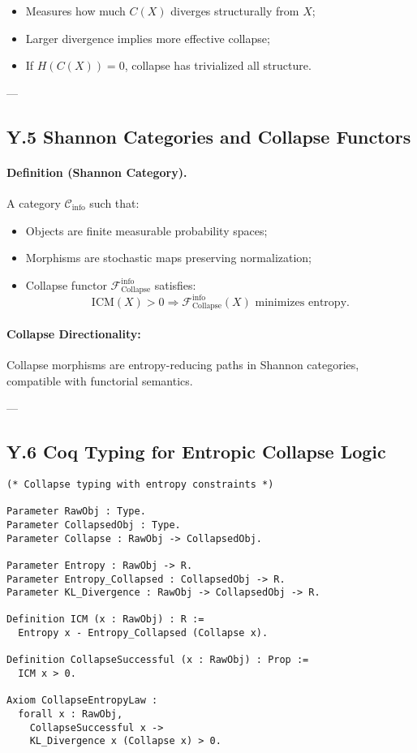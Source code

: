 \documentclass[11pt]{article}
\begin{document}
\begin{itemize}
    \item Measures how much \( C(X) \) diverges structurally from \( X \);
    \item Larger divergence implies more effective collapse;
    \item If \( H(C(X)) = 0 \), collapse has trivialized all structure.
\end{itemize}

---

\subsection*{Y.5 Shannon Categories and Collapse Functors}

\paragraph{Definition (Shannon Category).}
A category \( \mathcal{C}_{\mathrm{info}} \) such that:
\begin{itemize}
    \item Objects are finite measurable probability spaces;
    \item Morphisms are stochastic maps preserving normalization;
    \item Collapse functor \( \mathcal{F}_{\mathrm{Collapse}}^{\mathrm{info}} \) satisfies:
    \[
    \mathrm{ICM}(X) > 0 \Rightarrow \mathcal{F}_{\mathrm{Collapse}}^{\mathrm{info}}(X) \text{ minimizes entropy.}
    \]
\end{itemize}

\paragraph{Collapse Directionality:}
Collapse morphisms are entropy-reducing paths in Shannon categories, compatible with functorial semantics.

---

\subsection*{Y.6 Coq Typing for Entropic Collapse Logic}

\begin{lstlisting}[language=Coq, mathescape=false]
(* Collapse typing with entropy constraints *)

Parameter RawObj : Type.
Parameter CollapsedObj : Type.
Parameter Collapse : RawObj -> CollapsedObj.

Parameter Entropy : RawObj -> R.
Parameter Entropy_Collapsed : CollapsedObj -> R.
Parameter KL_Divergence : RawObj -> CollapsedObj -> R.

Definition ICM (x : RawObj) : R :=
  Entropy x - Entropy_Collapsed (Collapse x).

Definition CollapseSuccessful (x : RawObj) : Prop :=
  ICM x > 0.

Axiom CollapseEntropyLaw :
  forall x : RawObj,
    CollapseSuccessful x ->
    KL_Divergence x (Collapse x) > 0.
\end{lstlisting}
\end{document}
